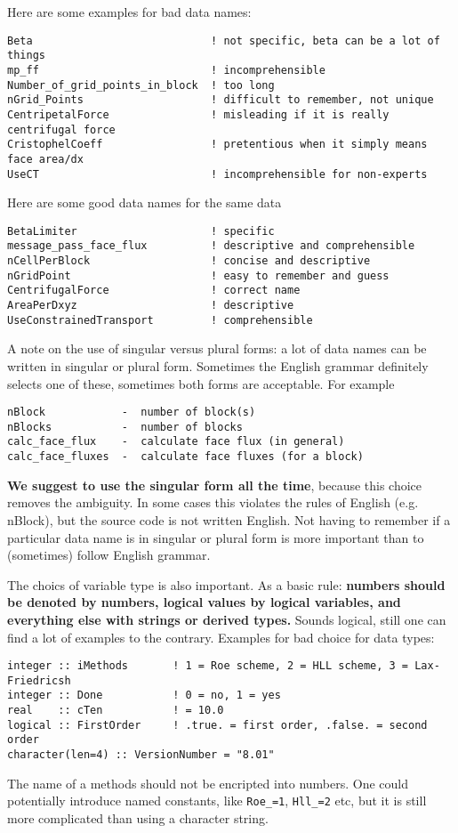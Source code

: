 \documentclass{article}
\begin{document}
Here are some examples for bad data names:
\begin{verbatim}
Beta                            ! not specific, beta can be a lot of things
mp_ff                           ! incomprehensible
Number_of_grid_points_in_block  ! too long
nGrid_Points                    ! difficult to remember, not unique
CentripetalForce                ! misleading if it is really centrifugal force
CristophelCoeff                 ! pretentious when it simply means face area/dx
UseCT                           ! incomprehensible for non-experts
\end{verbatim}
Here are some good data names for the same data
\begin{verbatim}
BetaLimiter                     ! specific
message_pass_face_flux          ! descriptive and comprehensible
nCellPerBlock                   ! concise and descriptive
nGridPoint                      ! easy to remember and guess
CentrifugalForce                ! correct name
AreaPerDxyz                     ! descriptive
UseConstrainedTransport         ! comprehensible
\end{verbatim}
A note on the use of singular versus plural forms: 
a lot of data names can be written in singular or plural form. 
Sometimes the English grammar definitely selects one of these, sometimes
both forms are acceptable. For example
\begin{verbatim}
nBlock            -  number of block(s) 
nBlocks           -  number of blocks
calc_face_flux    -  calculate face flux (in general)
calc_face_fluxes  -  calculate face fluxes (for a block)
\end{verbatim}
{\bf We suggest to use the singular form all the time}, because
this choice removes the ambiguity. In some cases this violates the rules of
English (e.g. nBlock), but the source code is not written English. 
Not having to remember if a particular data name is in singular 
or plural form is more important than to (sometimes) follow English grammar.

The choics of variable type is also important. As a basic rule:
{\bf numbers should be denoted by numbers, logical values by logical variables,
and everything else with strings or derived types.}
Sounds logical, still one can find a lot of examples to the contrary.
Examples for bad choice for data types:
\begin{verbatim}
integer :: iMethods       ! 1 = Roe scheme, 2 = HLL scheme, 3 = Lax-Friedricsh
integer :: Done           ! 0 = no, 1 = yes
real    :: cTen           ! = 10.0
logical :: FirstOrder     ! .true. = first order, .false. = second order
character(len=4) :: VersionNumber = "8.01"
\end{verbatim}
The name of a methods should not be encripted into numbers. One could
potentially introduce named constants, like {\tt Roe\_=1}, {\tt Hll\_=2} etc,
but it is still more complicated than using a character string.
\end{document}
